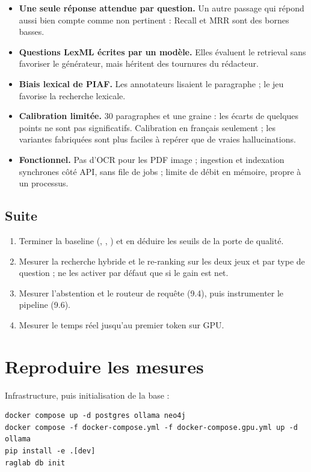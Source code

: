 \documentclass[11pt,a4paper]{article}
\newcommand{\code}[1]{\texttt{\detokenize{#1}}}
\begin{document}
\begin{itemize}
  \item \textbf{Une seule réponse attendue par question.} Un autre passage qui répond aussi bien compte comme non pertinent : Recall et MRR sont des bornes basses.
  \item \textbf{Questions LexML écrites par un modèle.} Elles évaluent le retrieval sans favoriser le générateur, mais héritent des tournures du rédacteur.
  \item \textbf{Biais lexical de PIAF.} Les annotateurs lisaient le paragraphe ; le jeu favorise la recherche lexicale.
  \item \textbf{Calibration limitée.} 30 paragraphes et une graine : les écarts de quelques points ne sont pas significatifs. Calibration en français seulement ; les variantes fabriquées sont plus faciles à repérer que de vraies hallucinations.
  \item \textbf{Fonctionnel.} Pas d'OCR pour les PDF image ; ingestion et indexation synchrones côté API, sans file de jobs ; limite de débit en mémoire, propre à un processus.
\end{itemize}

\subsection{Suite}

\begin{enumerate}
  \item Terminer la baseline (\code{baseline-v0}, \code{-v0-cache}, \code{-v1}) et en déduire les seuils de la porte de qualité.
  \item Mesurer la recherche hybride et le re-ranking sur les deux jeux et par type de question ; ne les activer par défaut que si le gain est net.
  \item Mesurer l'abstention et le routeur de requête (9.4), puis instrumenter le pipeline (9.6).
  \item Mesurer le temps réel jusqu'au premier token sur GPU.
\end{enumerate}

\appendix
\section{Reproduire les mesures}

Infrastructure, puis initialisation de la base :

\begin{lstlisting}
docker compose up -d postgres ollama neo4j
docker compose -f docker-compose.yml -f docker-compose.gpu.yml up -d ollama
pip install -e .[dev]
raglab db init
\end{lstlisting}
\end{document}
